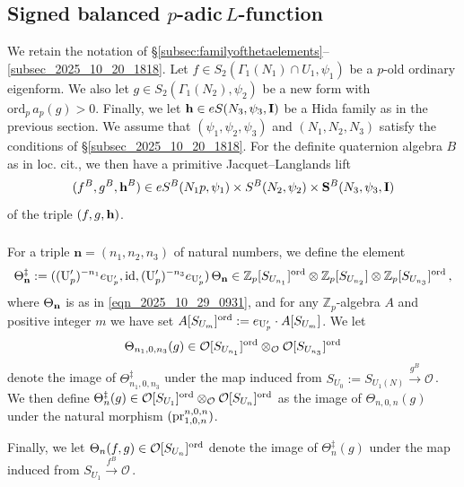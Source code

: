 \documentclass{amsart}
\numberwithin{equation}{section}
\newcommand{\Zp}{\mathbb{Z}_p}
\newcommand{\ord}{\mathrm{ord}}
\newcommand{\cO}{\mathcal{O}}
\newcommand{\h}{\textup{\bf h}}
\begin{document}
\subsection{Signed balanced \texorpdfstring{$p$-adic\,}\ \texorpdfstring{$L$-function\,}\ }\label{subsec_signedpadic}
We retain the notation of \S \ref{subsec:familyofthetaelements}--\ref{subsec_2025_10_20_1818}. Let $f \in S_2(\Gamma_1(N_1)\cap U_1, \psi_1)$ be a $p$-old ordinary eigenform. We also let $g \in S_2(\Gamma_1(N_2),\psi_2
)$ be a new form with $\ord_p\,a_p(g)>0$. Finally, we let $\h\in e S(N_3,\psi_3,\mathbf{I})$ be a Hida family as in the previous section. We assume that $(\psi_1,\psi_2,\psi_3)$ and $(N_1,N_2,N_3)$ satisfy the conditions of \S\ref{subsec_2025_10_20_1818}. For the definite quaternion algebra $B$ as in loc. cit., we then have a primitive Jacquet--Langlands lift 
$$(f^B,g^B,\h^B)\in e S^B(N_1p,\psi_1)\times S^B(N_2,\psi_2) \times \mathbf{S}^B(N_3,\psi_3,\mathbf{I})$$
of the triple $(f,g,\h)$.


\subsubsection{} For a triple $\mathbf{n}=(n_1,n_2,n_3)$ of natural numbers, we define the element
$$\Theta_{{\mathbf{n}}}^{\ddagger}:=((\mathrm{U}_{p}')^{-n_1}e_{\mathrm{U}_{p}'},{\rm id},(\mathrm{U}_{p}')^{-n_3}e_{\mathrm{U}_{p}'})\,\Theta_{{\mathbf{n}}}\in \Zp[S_{U_{n_1}}]^{\rm ord}\otimes\Zp[S_{U_{n_2}}]\otimes\Zp[S_{U_{n_3}}]^{\rm ord}\,,$$ 
where $\Theta_{\bf n}$ is as in \eqref{eqn_2025_10_29_0931}, and for any $\Zp$-algebra $A$ and positive integer $m$ we have set $A[S_{U_{m}}]^{\rm ord}:=e_{\mathrm{U}_{p}'}\cdot A[S_{U_{m}}]$. We let 
$$\Theta_{n_1,0,n_3}(g)\in  \cO[S_{U_{n_1}}]^{\rm ord}\otimes_\cO\cO[S_{U_{n_3}}]^{\rm ord}$$ 
denote the image of $\Theta_{n_1,0,n_3}^{\ddagger}$
under the map induced from $S_{U_0}:=S_{U_{1}(N)}\xrightarrow{\,g^B\,} \cO$\,. We then define $\Theta_{n}^\ddagger(g)\in  \cO[S_{U_{1}}]^{\rm ord}\otimes_\cO\cO[S_{U_{n}}]^{\rm ord}$ as the image of $\Theta_{n,0,n}(g)$ under the natural morphism $({\rm pr}^{n,0,n}_{1,0,n})$. 

Finally, we let $\Theta_{n}(f,g)\in \cO[S_{U_n}]^{\rm ord}$ denote the image of $\Theta_{n}^\ddagger(g)$ under the map induced from $S_{U_1}\xrightarrow{\,f^B\,} \cO$\,. 
\end{document}
